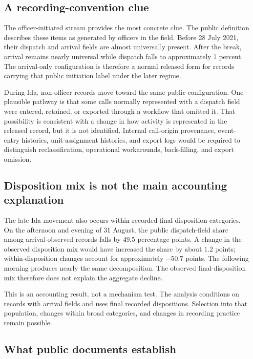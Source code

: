 \documentclass[11pt]{article}
\begin{document}
\subsection{A recording-convention clue}

The officer-initiated stream provides the most concrete clue. The public definition describes these items as generated by officers in the field. Before 28 July 2021, their dispatch and arrival fields are almost universally present. After the break, arrival remains nearly universal while dispatch falls to approximately 1 percent. The arrival-only configuration is therefore a normal released form for records carrying that public initiation label under the later regime.

During Ida, non-officer records move toward the same public configuration. One plausible pathway is that some calls normally represented with a dispatch field were entered, retained, or exported through a workflow that omitted it. That possibility is consistent with a change in how activity is represented in the released record, but it is not identified. Internal call-origin provenance, event-entry histories, unit-assignment histories, and export logs would be required to distinguish reclassification, operational workarounds, back-filling, and export omission.

\subsection{Disposition mix is not the main accounting explanation}

The late Ida movement also occurs within recorded final-disposition categories. On the afternoon and evening of 31 August, the public dispatch-field share among arrival-observed records falls by 49.5 percentage points. A change in the observed disposition mix would have increased the share by about 1.2 points; within-disposition changes account for approximately $-50.7$ points. The following morning produces nearly the same decomposition. The observed final-disposition mix therefore does not explain the aggregate decline.

This is an accounting result, not a mechanism test. The analysis conditions on records with arrival fields and uses final recorded dispositions. Selection into that population, changes within broad categories, and changes in recording practice remain possible.

\subsection{What public documents establish}
\end{document}
